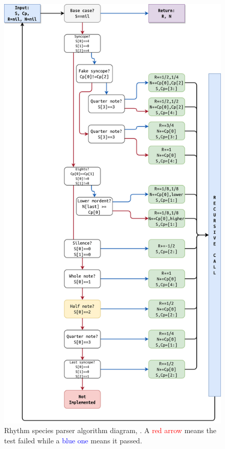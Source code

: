 \begin{figure}[]
    \includegraphics[scale=0.23, center]{Images/build_rhythmic_pattern.png}
    \caption{Rhythm species parser algorithm diagram, . A \textcolor{red}{red arrow} means the test failed while a \textcolor{blue}{blue one} means it passed.}
    \label{fig:rhythmdiagram}
\end{figure}